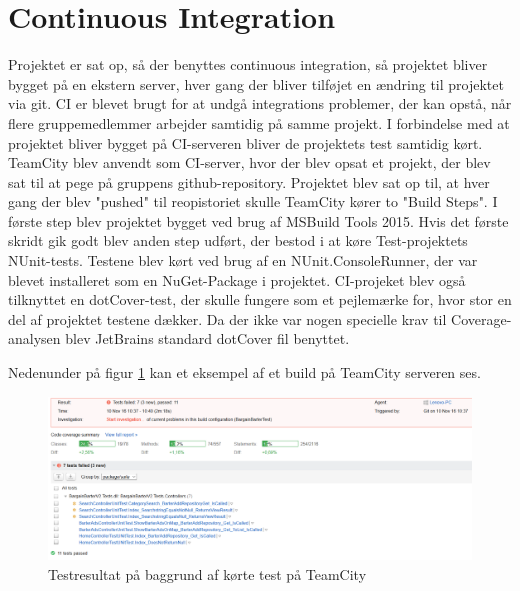 \section{Continuous Integration}
Projektet er sat op, så der benyttes continuous integration, så projektet bliver bygget på en ekstern server, hver gang der bliver tilføjet en ændring til projektet via git. CI er blevet brugt for at undgå integrations problemer, der kan opstå, når flere gruppemedlemmer arbejder samtidig på samme projekt.
I forbindelse med at projektet bliver bygget på CI-serveren bliver de projektets test samtidig kørt.
\\
\noindent TeamCity blev anvendt som CI-server, hvor der blev opsat et  projekt, der blev sat til at pege på gruppens github-repository. Projektet blev sat op til, at hver gang der blev "pushed" til reopistoriet skulle TeamCity kører to "Build Steps". I første step blev projektet bygget ved brug af MSBuild Tools 2015. Hvis det første skridt gik godt blev anden step udført, der bestod i at køre Test-projektets NUnit-tests. Testene blev kørt ved brug af en NUnit.ConsoleRunner, der var blevet installeret som en NuGet-Package i projektet.  
CI-projeket blev også tilknyttet en dotCover-test, der skulle fungere som et pejlemærke for, hvor stor en del af projektet testene dækker. Da der ikke var nogen specielle krav til Coverage-analysen blev JetBrains standard dotCover fil benyttet.

\noindent Nedenunder på figur \ref{fig:TeamCityTest} kan et eksempel af et build på TeamCity serveren ses. 
\begin{figure}[ht!]
	\centering
	\includegraphics[width=120mm]{figures/TeamCityTest.png}
	\caption{Testresultat på baggrund af kørte test på TeamCity}
	\label{fig:TeamCityTest}
\end{figure}

